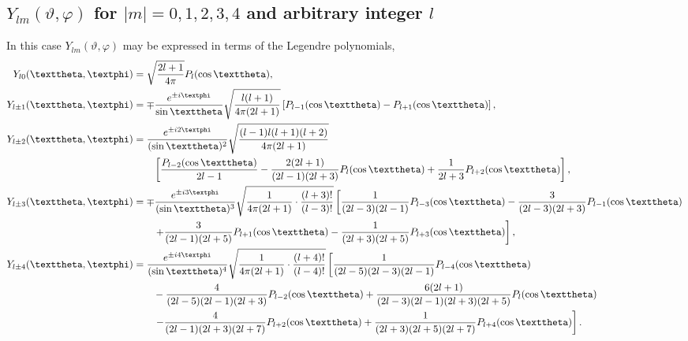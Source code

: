 \subsection{$Y_{l m}(\vartheta, \varphi)$ for $|m|=0,1,2,3,4$ and arbitrary integer $l$}\label{sec:5.13.2}
In this case $Y_{l m}(\vartheta, \varphi)$ may be expressed in terms of the Legendre polynomials,
\begin{align}
Y_{l 0}(\vartheta, \varphi)&=\sqrt{\frac{2 l+1}{4 \pi}} P_{l}(\cos \vartheta),  \label{eq:5:13:1}\\
Y_{l \pm 1}(\vartheta, \varphi)&=\mp \frac{e^{ \pm i \varphi}}{\sin \vartheta} \sqrt{\frac{l(l+1)}{4 \pi(2 l+1)}}\left[P_{l-1}(\cos \vartheta)-P_{l+1}(\cos \vartheta)\right],  \label{eq:5:13:2}\\
Y_{l \pm 2}(\vartheta, \varphi)&=\frac{e^{ \pm i 2 \varphi}}{(\sin \vartheta)^{2}} \sqrt{\frac{(l-1) l(l+1)(l+2)}{4 \pi(2 l+1)}}  \notag\\
&\qquad\left[\frac{P_{l-2}(\cos \vartheta)}{2 l-1}
-\frac{2(2 l+1)}{(2 l-1)(2 l+3)} P_{l}(\cos \vartheta)+\frac{1}{2 l+3} P_{l+2}(\cos \vartheta)\right],  \label{eq:5:13:3}\\
Y_{l \pm 3}(\vartheta, \varphi)&=\mp \frac{e^{ \pm i 3 \varphi}}{(\sin \vartheta)^{3}} \sqrt{\frac{1}{4 \pi(2 l+1)} \cdot \frac{(l+3)!}{(l-3)!}}\left[\frac{1}{(2 l-3)(2 l-1)} P_{l-3}(\cos \vartheta)-\frac{3}{(2 l-3)(2 l+3)} P_{l-1}(\cos \vartheta)\right.  \notag\\
&\qquad\left.+\frac{3}{(2 l-1)(2 l+5)} P_{l+1}(\cos \vartheta)-\frac{1}{(2 l+3)(2 l+5)} P_{l+3}(\cos \vartheta)\right],  \label{eq:5:13:4}\\
Y_{l \pm 4}(\vartheta, \varphi)&=\frac{e^{ \pm i 4 \varphi}}{(\sin \vartheta)^{4}} \sqrt{\frac{1}{4 \pi(2 l+1)} \cdot \frac{(l+4)!}{(l-4)!}}\left[\frac{1}{(2 l-5)(2 l-3)(2 l-1)} P_{l-4}(\cos \vartheta)\right.  \notag\\
&\qquad-\frac{4}{(2 l-5)(2 l-1)(2 l+3)} P_{l-2}(\cos \vartheta)+\frac{6(2 l+1)}{(2 l-3)(2 l-1)(2 l+3)(2 l+5)} P_{l}(\cos \vartheta)  \notag\\
&\qquad\left.-\frac{4}{(2 l-1)(2 l+3)(2 l+7)} P_{l+2}(\cos \vartheta)+\frac{1}{(2 l+3)(2 l+5)(2 l+7)} P_{l+4}(\cos \vartheta)\right] . \label{eq:5:13:5}
\end{align}
